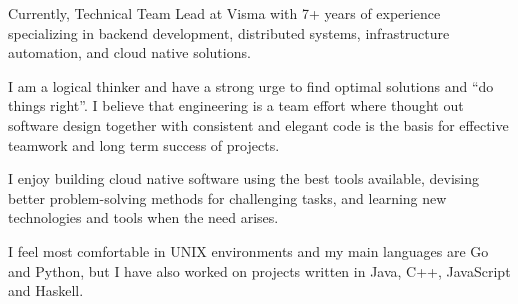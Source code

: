 

\begin{cvparagraph}

Currently, Technical Team Lead at Visma with 7+ years of experience specializing in backend development, distributed systems, infrastructure automation, and cloud native solutions.

I am a logical thinker and have a strong urge to find optimal solutions and ``do things right”. I believe that engineering is a team effort where thought out software design together with consistent and elegant code is the basis for effective teamwork and long term success of projects.

I enjoy building cloud native software using the best tools available, devising better problem-solving methods for challenging tasks, and learning new technologies and tools when the need arises.

I feel most comfortable in UNIX environments and my main languages are Go and Python, but I have also worked on projects written in Java, C++, JavaScript and Haskell.

\end{cvparagraph}

